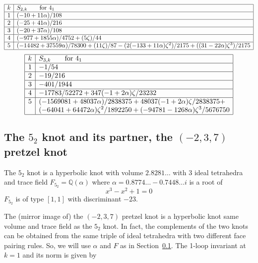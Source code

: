 \documentclass[12pt]{amsart}
\theoremstyle{definition}
\def\BQ{\mathbb Q}
\def\a{\alpha}
\begin{document}
{\small
$$
\begin{array}{|c|l|} \hline
k & S_{2,k} \qquad \text{for $4_1$} \\ \hline
1 & (-10 + 11 \a)/108 \\ \hline
2 & (-25 + 41 \a)/216 \\ \hline
3 & (-20 + 37 \a)/108 \\ \hline
4 & (-977 + 1855 \a)/4752 + (5 \zeta)/44 \\ \hline
5 & (-14482 + 37559 \a)/78300 + (11 \zeta)/87 - (
 2 (-133 + 11 \a) \zeta^2)/2175 + ((31 - 22 \a) \zeta^3)/2175 \\ \hline
\end{array}
$$
$$
\begin{array}{|c|l|} \hline
k & S_{3,k} \qquad \text{for $4_1$} \\ \hline
1 & -1/54 \\ \hline
2 & -19/216 \\ \hline
3 & -401/1944 \\ \hline
4 & -17783/52272 + 347 (-1 + 2 \a) \zeta/23232 \\ \hline
5 & (-1569081 + 48037 \a)/2838375 + 
48037 (-1 + 2 \a) \zeta/2838375 + 
\\ & 
(-64041 + 64472 \a) \zeta^2/1892250 + 
(-94781 - 1268 \a) \zeta^3/5676750
\\ \hline
\end{array}
$$
}

\subsection{The $5_2$ knot and its partner, the $(-2,3,7)$ pretzel knot}
\label{sub.52}

The $5_2$ knot is a hyperbolic knot with
volume $2.8281\dots$ with $3$ ideal tetrahedra and trace
field $F_{5_2}=\BQ(\a)$ where $\a=0.8774 \dots - 0.7448 \dots i $ is a root of 
$$
x^3 -x^2 + 1 = 0
$$
$F_{5_2}$ is of type $[1,1]$ with discriminant $-23$.

The (mirror image of) the $(-2,3,7)$ pretzel knot is a hyperbolic knot same
volume and trace field as the $5_2$ knot. In fact, the complements of the
two knots can be obtained from the same triple of ideal tetrahedra with
two different face pairing rules. So, we will use $\a$ and $F$ as in 
Section~\ref{sub.52}. The 1-loop invariant at $k=1$ and its norm is given by
\end{document}
